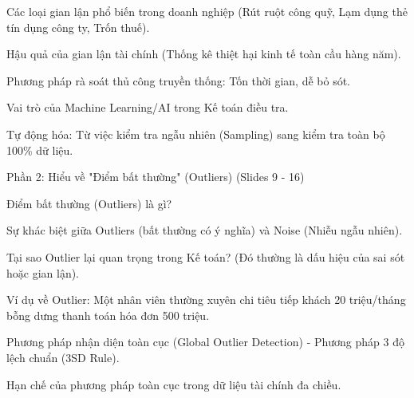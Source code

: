 \documentclass[aspectratio=169]{beamer}
\begin{document}
\begin{frame}{Các loại gian lận phổ biến trong doanh nghiệp (Rút ruột công quỹ, Lạm dụng thẻ tín dụng công ty, Trốn thuế).}
\end{frame}


\begin{frame}{Hậu quả của gian lận tài chính (Thống kê thiệt hại kinh tế toàn cầu hàng năm).}
\end{frame}


\begin{frame}{Phương pháp rà soát thủ công truyền thống: Tốn thời gian, dễ bỏ sót.}
\end{frame}


\begin{frame}{Vai trò của Machine Learning/AI trong Kế toán điều tra.}
\end{frame}


\begin{frame}{Tự động hóa: Từ việc kiểm tra ngẫu nhiên (Sampling) sang kiểm tra toàn bộ 100\% dữ liệu.}
\end{frame}


\begin{frame}{Phần 2: Hiểu về "Điểm bất thường" (Outliers) (Slides 9 - 16)}
\end{frame}


\begin{frame}{Điểm bất thường (Outliers) là gì?}
\end{frame}


\begin{frame}{Sự khác biệt giữa Outliers (bất thường có ý nghĩa) và Noise (Nhiễu ngẫu nhiên).}
\end{frame}


\begin{frame}{Tại sao Outlier lại quan trọng trong Kế toán? (Đó thường là dấu hiệu của sai sót hoặc gian lận).}
\end{frame}


\begin{frame}{Ví dụ về Outlier: Một nhân viên thường xuyên chi tiêu tiếp khách 20 triệu/tháng bỗng dưng thanh toán hóa đơn 500 triệu.}
\end{frame}


\begin{frame}{Phương pháp nhận diện toàn cục (Global Outlier Detection) - Phương pháp 3 độ lệch chuẩn (3SD Rule).}
\end{frame}


\begin{frame}{Hạn chế của phương pháp toàn cục trong dữ liệu tài chính đa chiều.}
\end{frame}
\end{document}
